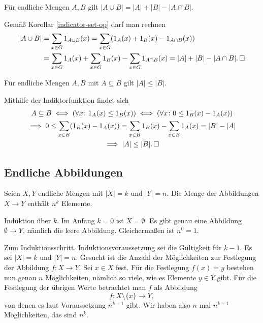 \begin{Satz}
Für endliche Mengen $A,B$ gilt $|A\cup B| = |A|+|B|-|A\cap B|$.
\end{Satz}
\begin{Beweis}
Gemäß Korollar \ref{indicator-set-op} darf man rechnen
\begin{align*}
|A\cup B| &= \sum_{x\in G} 1_{A\cup B}(x)
= \sum_{x\in G} (1_A(x) + 1_B(x) - 1_{A\cap B}(x))\\
&= \sum_{x\in G} 1_A(x) + \sum_{x\in G} 1_B(x) - \sum_{x\in G} 1_{A\cap B}(x)
= |A| + |B| - |A\cap B|.\,\square
\end{align*}
\end{Beweis}

\begin{Korollar}
Für endliche Mengen $A,B$ mit $A\subseteq B$ gilt $|A|\le |B|$.
\end{Korollar}
\begin{Beweis}
Mithilfe der Indiktorfunktion findet sich
\begin{gather*}
A\subseteq B \iff (\forall x\colon 1_A(x)\le 1_B(x))
\iff (\forall x\colon 0\le 1_B(x)-1_A(x))\\
\implies 0\le \sum_{x\in B}(1_B(x)-1_A(x))
= \sum_{x\in B} 1_B(x) - \sum_{x\in B} 1_A(x) = |B| - |A|\\
\implies |A|\le |B|.\,\square
\end{gather*}
\end{Beweis}

\newpage
\subsection{Endliche Abbildungen}

\begin{Satz}\newlinefirst
Seien $X,Y$ endliche Mengen mit $|X| = k$ und $|Y|=n$. Die Menge
der Abbildungen $X\to Y$ enthält $n^k$ Elemente.
\end{Satz}
\begin{Beweis}
Induktion über $k$. Im Anfang $k=0$ ist $X=\emptyset$. Es gibt genau
eine Abbildung $\emptyset\to Y$, nämlich die leere Abbildung.
Gleichermaßen ist $n^0=1$.

Zum Induktionsschritt. Induktionsvoraussetzung sei die Gültigkeit
für $k-1$. Es  sei $|X|=k$ und $|Y|=n$. Gesucht ist die Anzahl
der Möglichkeiten zur Festlegung der Abbildung $f\colon X\to Y$.
Sei $x\in X$ fest. Für die Festlegung $f(x)=y$ bestehen nun genau $n$
Möglichkeiten, nämlich so viele, wie es Elemente $y\in Y$ gibt.
Für die Festlegung der übrigen Werte betrachtet man $f$ als Abbildung%
\[f\colon X\setminus\{x\}\to Y,\]
von denen es laut Voraussetzung $n^{k-1}$ gibt. Wir haben also
$n$ mal $n^{k-1}$ Möglichkeiten, das sind $n^k$.\,\qedsymbol
\end{Beweis}

